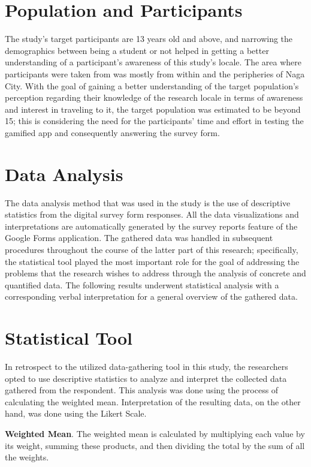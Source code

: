\documentclass[11pt]{research}
\begin{document}
\section{Population and Participants}
The study’s target participants are 13 years old and above, and narrowing the demographics between being a student or not helped in getting a better understanding of a participant’s awareness of this study’s locale. The area where participants were taken from was mostly from within and the peripheries of Naga City. With the goal of gaining a better understanding of the target population's perception regarding their knowledge of the research locale in terms of awareness and interest in traveling to it, the target population was estimated to be beyond 15; this is considering the need for the participants' time and effort in testing the gamified app and consequently answering the survey form.

\section{Data Analysis}
The data analysis method that was used in the study is the use of descriptive statistics from the digital survey form responses. All the data visualizations and interpretations are automatically generated by the survey reports feature of the Google Forms application. The gathered data was handled in subsequent procedures throughout the course of the latter part of this research; specifically, the statistical tool played the most important role for the goal of addressing the problems that the research wishes to address through the analysis of concrete and quantified data. The following results underwent statistical analysis with a corresponding verbal interpretation for a general overview of the gathered data. 

\section{Statistical Tool}
In retrospect to the utilized data-gathering tool in this study, the researchers opted to use descriptive statistics to analyze and interpret the collected data gathered from the respondent. This analysis was done using the process of calculating the weighted mean. Interpretation of the resulting data, on the other hand, was done using the Likert Scale.

\textbf{Weighted Mean}. The weighted mean is calculated by multiplying each value by its weight, summing these products, and then dividing the total by the sum of all the weights.
\end{document}
